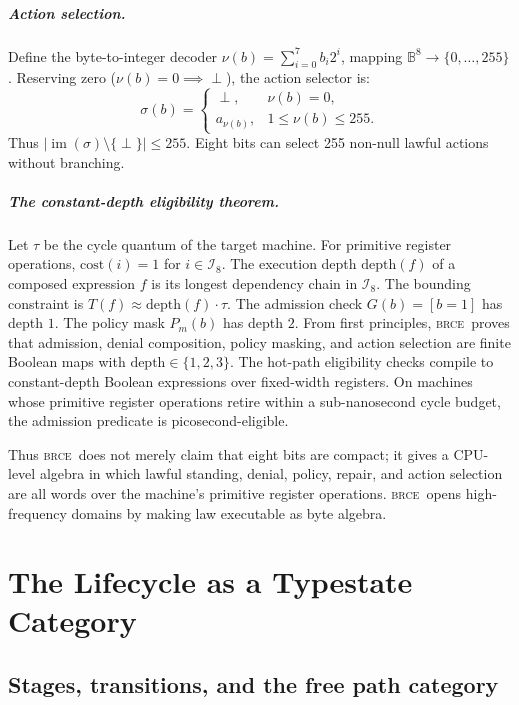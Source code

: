 \documentclass[11pt,oneside]{book}
\theoremstyle{definition}
\theoremstyle{plain}
\theoremstyle{remark}
\DeclareMathOperator{\im}{im}
\newcommand{\BRCE}{\textsc{brce}}
\begin{document}
\paragraph{Action selection.}
Define the byte-to-integer decoder $\nu(b) = \sum_{i=0}^7 b_i 2^i$, mapping $\mathbb{B}^8 \to \{0, \dots, 255\}$. Reserving zero ($\nu(b)=0 \implies \perp$), the action selector is:
\[
\sigma(b) = \begin{cases}
\perp, & \nu(b) = 0, \\
a_{\nu(b)}, & 1 \le \nu(b) \le 255.
\end{cases}
\]
Thus $|\im(\sigma) \setminus \{\perp\}| \le 255$. Eight bits can select 255 non-null lawful actions without branching.

\paragraph{The constant-depth eligibility theorem.}

Let $\tau$ be the cycle quantum of the target machine. For primitive register operations, $\text{cost}(i) = 1$ for $i \in \mathcal{I}_8$. The execution depth $\text{depth}(f)$ of a composed expression $f$ is its longest dependency chain in $\mathcal{I}_8$. The bounding constraint is $T(f) \approx \text{depth}(f) \cdot \tau$.
The admission check $G(b) = [b = 1]$ has depth $1$. The policy mask $P_m(b)$ has depth $2$. From first principles, \BRCE\ proves that admission, denial composition, policy masking, and action selection are finite Boolean maps with $\text{depth} \in \{1, 2, 3\}$. The hot-path eligibility checks compile to constant-depth Boolean expressions over fixed-width registers. On machines whose primitive register operations retire within a sub-nanosecond cycle budget, the admission predicate is picosecond-eligible.

Thus \BRCE\ does not merely claim that eight bits are compact; it gives a CPU-level algebra in which lawful standing, denial, policy, repair, and action selection are all words over the machine's primitive register operations. \BRCE\ opens high-frequency domains by making law executable as byte algebra.

\chapter{The Lifecycle as a Typestate Category}
\label{ch:life}

\section{Stages, transitions, and the free path category}
\end{document}
